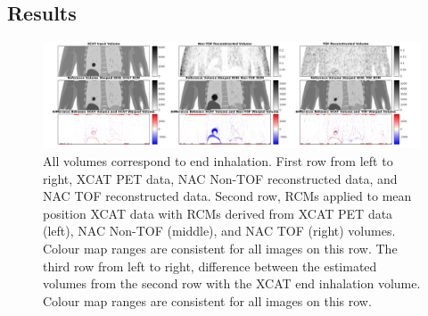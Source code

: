         \subsection{Results} \label{sec:impact_of_tof_on_respiratory_motion_model_estimation_using_pre_gated_no_intra_cycle_motion_nac_pet_results}
            \begin{figure}
                \centering
                
                \includegraphics[width=1.0\linewidth]{figures/motion_correction_1_results_1_output.png}
                
                \captionsetup{singlelinecheck=false}
                \caption{
                    All volumes correspond to end inhalation. First row from left to right, \gls{XCAT} \gls{PET} data, \gls{NAC} \gls{Non-TOF} reconstructed data, and \gls{NAC} \gls{TOF} reconstructed data. Second row, \glspl{RCM} applied to mean position \gls{XCAT} data with \glspl{RCM} derived from \gls{XCAT} \gls{PET} data (left), \gls{NAC} \gls{Non-TOF} (middle), and \gls{NAC} \gls{TOF} (right) volumes. Colour map ranges are consistent for all images on this row. The third row from left to right, difference between the estimated volumes from the second row with the \gls{XCAT} end inhalation volume. Colour map ranges are consistent for all images on this row.
                }
                \label{fig:impact_of_tof_on_respiratory_motion_model_estimation_using_pre_gated_no_intra_cycle_motion_nac_pet_results_output}
            \end{figure}
            
